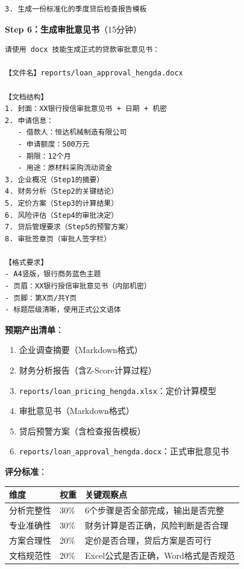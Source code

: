 \begin{exercisebox}
\begin{lstlisting}
3. 生成一份标准化的季度贷后检查报告模板
\end{lstlisting}

\textbf{Step 6：生成审批意见书}（15分钟）

\begin{lstlisting}
请使用 docx 技能生成正式的贷款审批意见书：

【文件名】reports/loan_approval_hengda.docx

【文档结构】
1. 封面：XX银行授信审批意见书 + 日期 + 机密
2. 申请信息：
   - 借款人：恒达机械制造有限公司
   - 申请额度：500万元
   - 期限：12个月
   - 用途：原材料采购流动资金
3. 企业概况（Step1的摘要）
4. 财务分析（Step2的关键结论）
5. 定价方案（Step3的计算结果）
6. 风险评估（Step4的审批决定）
7. 贷后管理要求（Step5的预警方案）
8. 审批签章页（审批人签字栏）

【格式要求】
- A4竖版，银行商务蓝色主题
- 页眉：XX银行授信审批意见书（内部机密）
- 页脚：第X页/共Y页
- 标题层级清晰，使用正式公文语体
\end{lstlisting}

\textbf{预期产出清单}：
\begin{enumerate}[leftmargin=2em]
  \item 企业调查摘要（Markdown格式）
  \item 财务分析报告（含Z-Score计算过程）
  \item \texttt{reports/loan\_pricing\_hengda.xlsx}：定价计算模型
  \item 审批意见书（Markdown格式）
  \item 贷后预警方案（含检查报告模板）
  \item \texttt{reports/loan\_approval\_hengda.docx}：正式审批意见书
\end{enumerate}

\textbf{评分标准}：
\begin{table}[H]
\centering
\begin{tabular}{lp{2cm}p{7cm}}
\toprule
\textbf{维度} & \textbf{权重} & \textbf{关键观察点} \\
\midrule
分析完整性 & 30\% & 6个步骤是否全部完成，输出是否完整 \\
专业准确性 & 30\% & 财务计算是否正确，风险判断是否合理 \\
方案合理性 & 20\% & 定价是否合理，贷后方案是否可行 \\
文档规范性 & 20\% & Excel公式是否正确，Word格式是否规范 \\
\bottomrule
\end{tabular}
\end{table}
\end{exercisebox}

